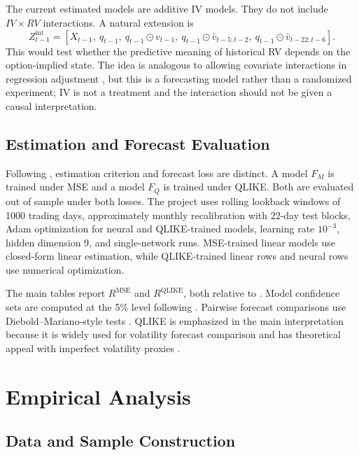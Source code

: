 \documentclass[11pt,a4paper]{article}
\newcommand{\model}[1]{\texttt{\detokenize{#1}}}
\newcommand{\mse}{\mathrm{MSE}}
\newcommand{\ql}{\mathrm{QLIKE}}
\begin{document}
The current estimated models are additive IV models.  They do not include \(IV\times RV\) interactions.  A natural extension is
\[
Z^{\mathrm{int}}_{t-1}
=
\left[
X_{t-1},\
q_{t-1},\
q_{t-1}\odot v_{t-1},\
q_{t-1}\odot \bar v_{t-5:t-2},\
q_{t-1}\odot \bar v_{t-22:t-6}
\right].
\]
This would test whether the predictive meaning of historical RV depends on the option-implied state.  The idea is analogous to allowing covariate interactions in regression adjustment \citep{lin2013agnostic}, but this is a forecasting model rather than a randomized experiment; IV is not a treatment and the interaction should not be given a causal interpretation.

\subsection{Estimation and Forecast Evaluation}
\label{subsec:evaluation}

Following \citet{zhang2025gnnhar}, estimation criterion and forecast loss are distinct.  A model \(F_M\) is trained under MSE and a model \(F_Q\) is trained under QLIKE.  Both are evaluated out of sample under both losses.  The project uses rolling lookback windows of 1000 trading days, approximately monthly recalibration with 22-day test blocks, Adam optimization for neural and QLIKE-trained models, learning rate \(10^{-3}\), hidden dimension 9, and single-network runs.  MSE-trained linear models use closed-form linear estimation, while QLIKE-trained linear rows and neural rows use numerical optimization.

The main tables report \(R^{\mse}\) and \(R^{\ql}\), both relative to \model{HAR_M}.  Model confidence sets are computed at the 5\% level following \citet{hansen2011mcs}.  Pairwise forecast comparisons use Diebold--Mariano-style tests \citep{diebold1995dm}.  QLIKE is emphasized in the main interpretation because it is widely used for volatility forecast comparison and has theoretical appeal with imperfect volatility proxies \citep{patton2011volatility}.

\section{Empirical Analysis}
\label{sec:empirical}

\subsection{Data and Sample Construction}
\label{subsec:data}
\end{document}
